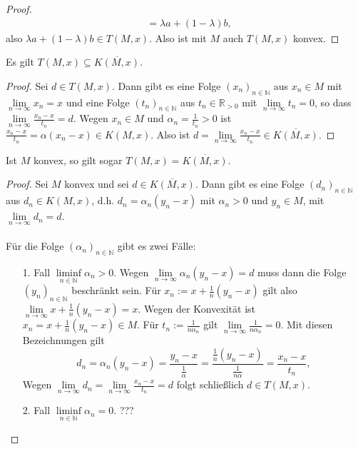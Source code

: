 \begin{compactenum}[(i)]
\begin{proof}
\begin{align*}
&=\lambda a+(1-\lambda)b,
\end{align*} also $\lambda a+(1-\lambda)b\in T(M,x)$.
Also ist mit $M$ auch $T(M,x)$ konvex.
\newpage
\end{proof}
\item Es gilt $T(M,x)\subseteq \overline{K(M,x)}$.
\begin{proof}
Sei $d\in T(M,x)$. Dann gibt es eine Folge $(x_n)_{n\in\mathbb N}$ aus $x_n\in M$ mit $\lim\limits_{n\to\infty} x_n=x$ und eine Folge $(t_n)_{n\in\mathbb N}$ aus $t_n\in\mathbb R_{>0}$ mit $\lim\limits_{n\to\infty}t_n = 0$, so dass $\lim\limits_{n\to\infty} \frac{x_n-x}{t_n}=d$.
Wegen $x_n\in M$ und $\alpha_n=\frac{1}{t_n}>0$ ist $\frac{x_n-x}{t_n}=\alpha(x_n-x)\in K(M,x)$. Also ist $d=\lim\limits_{n\to\infty} \frac{x_n-x}{t_n}\in \overline{K(M,x)}$.
\end{proof}
\item Ist $M$ konvex, so gilt sogar $T(M,x)=\overline{K(M,x)}$.
\begin{proof}
Sei $M$ konvex und sei $d\in \overline{K(M,x)}$. Dann gibt es eine Folge $(d_n)_{n\in\mathbb N}$ aus $d_n\in K(M,x)$, d.h. $d_n=\alpha_n(y_n-x)$ mit $\alpha_n>0$ und $y_n\in M$, mit $\lim\limits_{n\to\infty} d_n=d$. \\\\
Für die Folge $(\alpha_n)_{n\in\mathbb N}$ gibt es zwei Fälle:
\begin{enumerate}
\item[1.] Fall $\liminf\limits_{n\in\mathbb N}\alpha_n>0$. Wegen $\lim\limits_{n\to\infty}\alpha_n(y_n-x)=d$ muss dann die Folge $(y_n)_{n\in\mathbb N}$ beschränkt sein. Für $x_n:=x+\frac{1}{n}(y_n-x)$ gilt also $\lim\limits_{n\to\infty} x+\frac{1}{n}(y_n-x)=x$. Wegen der Konvexität ist $x_n=x+\frac{1}{n}(y_n-x)\in M$. Für $t_n:=\frac{1}{n\alpha_n}$ gilt $\lim\limits_{n\to\infty} \frac{1}{n\alpha_n}=0$. Mit diesen Bezeichnungen gilt $$d_n=\alpha_n(y_n-x)=\frac{y_n-x}{\frac{1}{\alpha}}=\frac{\frac{1}{n}(y_n-x)}{\frac{1}{n\alpha}}=\frac{x_n-x}{t_n},$$
Wegen $\lim\limits_{n\to\infty} d_n=\lim\limits_{n\to\infty}\frac{x_n-x}{t_n}=d$ folgt schließlich $d\in T(M,x)$.
\item[2.] Fall $\liminf\limits_{n\in\mathbb N}\alpha_n=0$. ???
\end{enumerate}
\end{proof}
\end{compactenum}